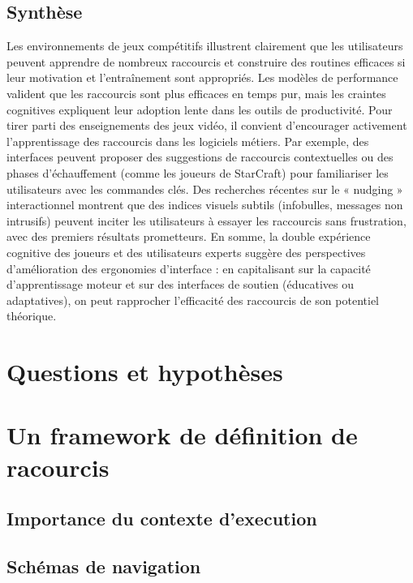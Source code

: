 \documentclass[a4paper,12pt]{article}
\begin{document}
\subsection{Synthèse}
\label{sec:orge1a1faa}
Les environnements de jeux compétitifs illustrent clairement que les utilisateurs peuvent apprendre de nombreux raccourcis et construire des routines efficaces si leur motivation et l'entraînement sont appropriés. Les modèles de performance valident que les raccourcis sont plus efficaces en temps pur, mais les craintes cognitives expliquent leur adoption lente dans les outils de productivité. Pour tirer parti des enseignements des jeux vidéo, il convient d'encourager activement l'apprentissage des raccourcis dans les logiciels métiers. Par exemple, des interfaces peuvent proposer des suggestions de raccourcis contextuelles ou des phases d'échauffement (comme les joueurs de StarCraft) pour familiariser les utilisateurs avec les commandes clés. Des recherches récentes sur le « nudging » interactionnel montrent que des indices visuels subtils (infobulles, messages non intrusifs) peuvent inciter les utilisateurs à essayer les raccourcis sans frustration, avec des premiers résultats prometteurs\autocite{raursoIntermodalImprovementNudging2020}. En somme, la double expérience cognitive des joueurs et des utilisateurs experts suggère des perspectives d'amélioration des ergonomies d'interface : en capitalisant sur la capacité d'apprentissage moteur et sur des interfaces de soutien (éducatives ou adaptatives), on peut rapprocher l'efficacité des raccourcis de son potentiel théorique.
\section{Questions et hypothèses}
\label{sec:orge744348}

\section{Un framework de définition de racourcis}
\label{sec:orgcb535f2}
\subsection{Importance du contexte d'execution}
\label{sec:org87fe57a}

\subsection{Schémas de navigation}
\label{sec:orgaf05703}
\end{document}
